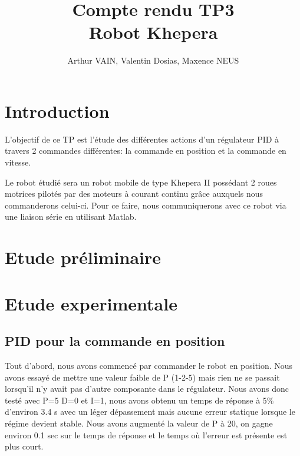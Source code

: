 \documentclass[a4paper]{article}
\begin{document}
	\title{\large{\textbf{Compte rendu TP3}}\\ Robot Khepera}
	\author{Arthur VAIN, Valentin Dosias, Maxence NEUS}
	\date{}
	
	\maketitle
	\newpage
	
	\tableofcontents
	\newpage
	
	\section{Introduction}
	L'objectif de ce TP est l'étude des différentes actions d'un régulateur PID à travers 2 commandes différentes: la commande en position et la commande en vitesse.
	
	Le robot étudié sera un robot mobile de type Khepera II possédant 2 roues motrices pilotés par des moteurs à courant continu grâce auxquels nous commanderons celui-ci.
	Pour ce faire, nous communiquerons avec ce robot via une liaison série en utilisant Matlab.
	
	\section{Etude préliminaire}
	
	\section{Etude experimentale}
	\subsection{PID pour la commande en position}
		Tout d’abord, nous avons commencé par commander le robot en position.
		Nous avons essayé de mettre une valeur faible de P (1-2-5) mais rien ne se passait lorsqu’il n’y avait pas d’autre composante dans le régulateur. Nous avons donc testé avec P=5 D=0 et I=1, nous avons obtenu un temps de réponse à 5\% d’environ 3.4 s avec un léger dépassement mais aucune erreur statique lorsque le régime devient stable.
		Nous avons augmenté la valeur de P à 20, on gagne environ 0.1 sec sur le temps de réponse et le temps où l'erreur est présente est plus court.
		
\end{document}
